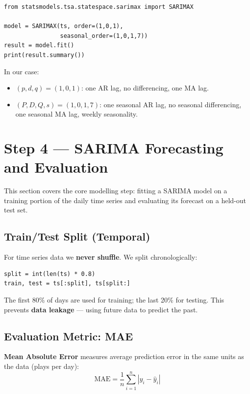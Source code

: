 \documentclass[12pt, a4paper]{article}
\begin{document}
\begin{lstlisting}
from statsmodels.tsa.statespace.sarimax import SARIMAX

model = SARIMAX(ts, order=(1,0,1),
                seasonal_order=(1,0,1,7))
result = model.fit()
print(result.summary())
\end{lstlisting}

In our case:
\begin{itemize}
    \item $(p,d,q) = (1,0,1)$: one AR lag, no differencing, one MA lag.
    \item $(P,D,Q,s) = (1,0,1,7)$: one seasonal AR lag, no seasonal differencing,
          one seasonal MA lag, weekly seasonality.
\end{itemize}

\section{Step 4 --- SARIMA Forecasting and Evaluation}

This section covers the core modelling step: fitting a SARIMA model on a
training portion of the daily time series and evaluating its forecast on a
held-out test set.

\subsection{Train/Test Split (Temporal)}
For time series data we \textbf{never shuffle}. We split chronologically:

\begin{lstlisting}
split = int(len(ts) * 0.8)
train, test = ts[:split], ts[split:]
\end{lstlisting}

The first 80\% of days are used for training; the last 20\% for testing.
This prevents \textbf{data leakage} — using future data to predict the past.

\subsection{Evaluation Metric: MAE}

\textbf{Mean Absolute Error} measures average prediction error in the same
units as the data (plays per day):
\[
    \text{MAE} = \frac{1}{n} \sum_{i=1}^{n} |y_i - \hat{y}_i|
\]
\end{document}
